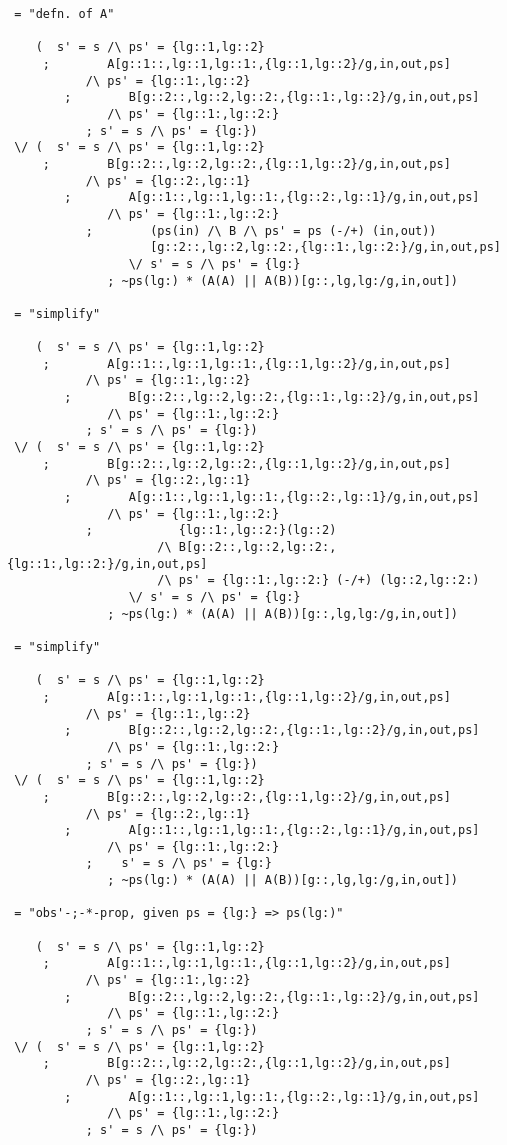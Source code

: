 \begin{verbatim}
 = "defn. of A"

    (  s' = s /\ ps' = {lg::1,lg::2}
     ;        A[g::1::,lg::1,lg::1:,{lg::1,lg::2}/g,in,out,ps]
           /\ ps' = {lg::1:,lg::2}
        ;        B[g::2::,lg::2,lg::2:,{lg::1:,lg::2}/g,in,out,ps]
              /\ ps' = {lg::1:,lg::2:}
           ; s' = s /\ ps' = {lg:})
 \/ (  s' = s /\ ps' = {lg::1,lg::2}
     ;        B[g::2::,lg::2,lg::2:,{lg::1,lg::2}/g,in,out,ps]
           /\ ps' = {lg::2:,lg::1}
        ;        A[g::1::,lg::1,lg::1:,{lg::2:,lg::1}/g,in,out,ps]
              /\ ps' = {lg::1:,lg::2:}
           ;        (ps(in) /\ B /\ ps' = ps (-/+) (in,out))
                    [g::2::,lg::2,lg::2:,{lg::1:,lg::2:}/g,in,out,ps]
                 \/ s' = s /\ ps' = {lg:}
              ; ~ps(lg:) * (A(A) || A(B))[g::,lg,lg:/g,in,out])

 = "simplify"

    (  s' = s /\ ps' = {lg::1,lg::2}
     ;        A[g::1::,lg::1,lg::1:,{lg::1,lg::2}/g,in,out,ps]
           /\ ps' = {lg::1:,lg::2}
        ;        B[g::2::,lg::2,lg::2:,{lg::1:,lg::2}/g,in,out,ps]
              /\ ps' = {lg::1:,lg::2:}
           ; s' = s /\ ps' = {lg:})
 \/ (  s' = s /\ ps' = {lg::1,lg::2}
     ;        B[g::2::,lg::2,lg::2:,{lg::1,lg::2}/g,in,out,ps]
           /\ ps' = {lg::2:,lg::1}
        ;        A[g::1::,lg::1,lg::1:,{lg::2:,lg::1}/g,in,out,ps]
              /\ ps' = {lg::1:,lg::2:}
           ;            {lg::1:,lg::2:}(lg::2)
                     /\ B[g::2::,lg::2,lg::2:,{lg::1:,lg::2:}/g,in,out,ps]
                     /\ ps' = {lg::1:,lg::2:} (-/+) (lg::2,lg::2:)
                 \/ s' = s /\ ps' = {lg:}
              ; ~ps(lg:) * (A(A) || A(B))[g::,lg,lg:/g,in,out])

 = "simplify"

    (  s' = s /\ ps' = {lg::1,lg::2}
     ;        A[g::1::,lg::1,lg::1:,{lg::1,lg::2}/g,in,out,ps]
           /\ ps' = {lg::1:,lg::2}
        ;        B[g::2::,lg::2,lg::2:,{lg::1:,lg::2}/g,in,out,ps]
              /\ ps' = {lg::1:,lg::2:}
           ; s' = s /\ ps' = {lg:})
 \/ (  s' = s /\ ps' = {lg::1,lg::2}
     ;        B[g::2::,lg::2,lg::2:,{lg::1,lg::2}/g,in,out,ps]
           /\ ps' = {lg::2:,lg::1}
        ;        A[g::1::,lg::1,lg::1:,{lg::2:,lg::1}/g,in,out,ps]
              /\ ps' = {lg::1:,lg::2:}
           ;    s' = s /\ ps' = {lg:}
              ; ~ps(lg:) * (A(A) || A(B))[g::,lg,lg:/g,in,out])

 = "obs'-;-*-prop, given ps = {lg:} => ps(lg:)"

    (  s' = s /\ ps' = {lg::1,lg::2}
     ;        A[g::1::,lg::1,lg::1:,{lg::1,lg::2}/g,in,out,ps]
           /\ ps' = {lg::1:,lg::2}
        ;        B[g::2::,lg::2,lg::2:,{lg::1:,lg::2}/g,in,out,ps]
              /\ ps' = {lg::1:,lg::2:}
           ; s' = s /\ ps' = {lg:})
 \/ (  s' = s /\ ps' = {lg::1,lg::2}
     ;        B[g::2::,lg::2,lg::2:,{lg::1,lg::2}/g,in,out,ps]
           /\ ps' = {lg::2:,lg::1}
        ;        A[g::1::,lg::1,lg::1:,{lg::2:,lg::1}/g,in,out,ps]
              /\ ps' = {lg::1:,lg::2:}
           ; s' = s /\ ps' = {lg:})

\end{verbatim}

